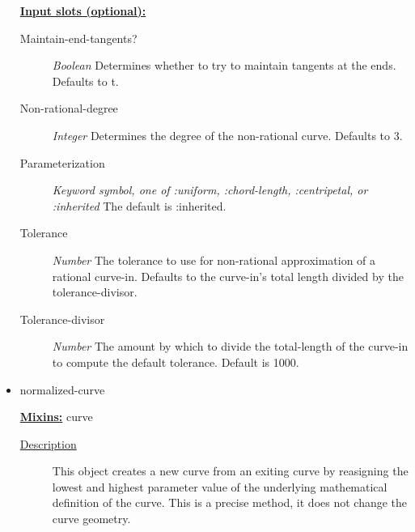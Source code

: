 \documentclass [11pt]{book}
\begin{document}
\begin{itemize}
\begin{description}
\end{description}






\textbf{
\underline{Input slots (optional):}}

\begin{description}

\item [Maintain-end-tangents?]
\emph{Boolean} Determines whether to try to maintain tangents at the ends. Defaults to t.


\item [Non-rational-degree]
\emph{Integer} Determines the degree of the non-rational curve. Defaults to 3.


\item [Parameterization]
\emph{Keyword symbol, one of :uniform, :chord-length, :centripetal, or :inherited} The default is :inherited.


\item [Tolerance]
\emph{Number} The tolerance to use for non-rational approximation of a rational curve-in.
Defaults to the curve-in's total length divided by the tolerance-divisor.


\item [Tolerance-divisor]
\emph{Number} The amount by which to divide the total-length of the curve-in to compute the default tolerance. Default is 1000.


\end{description}







\item {}normalized-curve


\textbf{
\underline{Mixins:}} curve





\begin{description}

\item [
\underline{Description}]


This object creates a new curve from an exiting 
curve by  reasigning the lowest and highest parameter value of the underlying 
mathematical definition of the curve. This is a precise method, it does not 
change the curve geometry.




\end{description}
\end{itemize}
\end{document}
